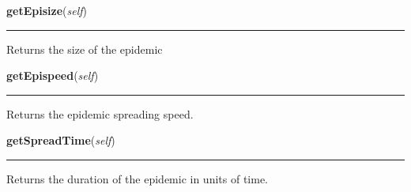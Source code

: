     \label{Epigrass:simobj:graph:getEpisize}

    \vspace{0.5ex}

    \begin{boxedminipage}{\textwidth}

    \raggedright \textbf{getEpisize}(\textit{self})

    \vspace{-1.5ex}

    \rule{\textwidth}{0.5\fboxrule}
    Returns the size of the epidemic

    \vspace{1ex}

    \end{boxedminipage}

    \label{Epigrass:simobj:graph:getEpispeed}

    \vspace{0.5ex}

    \begin{boxedminipage}{\textwidth}

    \raggedright \textbf{getEpispeed}(\textit{self})

    \vspace{-1.5ex}

    \rule{\textwidth}{0.5\fboxrule}
    Returns the epidemic spreading speed.

    \vspace{1ex}

    \end{boxedminipage}

    \label{Epigrass:simobj:graph:getSpreadTime}

    \vspace{0.5ex}

    \begin{boxedminipage}{\textwidth}

    \raggedright \textbf{getSpreadTime}(\textit{self})

    \vspace{-1.5ex}

    \rule{\textwidth}{0.5\fboxrule}
    Returns the duration of the epidemic in units of time.

    \vspace{1ex}

    \end{boxedminipage}


